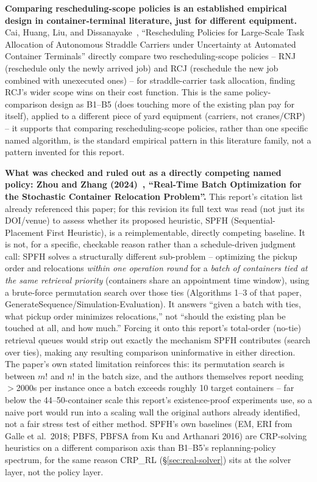 \documentclass[11pt]{article}
\begin{document}
\textbf{Comparing rescheduling-scope policies is an established empirical
design in container-terminal literature, just for different equipment.}
Cai, Huang, Liu, and Dissanayake~\cite{cai2014}, ``Rescheduling Policies for Large-Scale
Task Allocation of Autonomous Straddle Carriers under Uncertainty at
Automated Container Terminals'' directly compare two rescheduling-scope policies --
RNJ (reschedule only the newly arrived job) and RCJ (reschedule the new
job combined with unexecuted ones) -- for straddle-carrier task
allocation, finding RCJ's wider scope wins on their cost function. This
is the same policy-comparison design as B1--B5 (does touching more of the
existing plan pay for itself), applied to a different piece of yard
equipment (carriers, not cranes/CRP) -- it supports that comparing
rescheduling-scope policies, rather than one specific named algorithm, is
the standard empirical pattern in this literature family, not a pattern
invented for this report.

\textbf{What was checked and ruled out as a directly competing named
policy: Zhou and Zhang (2024)~\cite{zhou2024}, ``Real-Time Batch Optimization for the
Stochastic Container Relocation Problem''.} This report's citation
list already referenced this paper; for this revision its full text was
read (not just its DOI/venue) to assess whether its proposed heuristic,
SPFH (Sequential-Placement First Heuristic), is a reimplementable,
directly competing baseline. It is not, for a specific, checkable reason
rather than a schedule-driven judgment call: SPFH solves a structurally
different sub-problem -- optimizing the pickup order and relocations
\emph{within one operation round} for a \emph{batch of containers tied at
the same retrieval priority} (containers share an appointment time
window), using a brute-force permutation search over those ties
(Algorithms 1--3 of that paper, GenerateSequence/Simulation-Evaluation).
It answers ``given a batch with ties, what pickup order minimizes
relocations,'' not ``should the existing plan be touched at all, and how
much.'' Forcing it onto this report's total-order (no-tie) retrieval
queues would strip out exactly the mechanism SPFH contributes (search
over ties), making any resulting comparison uninformative in either
direction. The paper's own stated limitation reinforces this: its
permutation search is between $m!$ and $n!$ in the batch size, and the
authors themselves report needing $>$2000s per instance once a batch
exceeds roughly 10 target containers -- far below the 44--50-container
scale this report's existence-proof experiments use, so a naive port
would run into a scaling wall the original authors already identified,
not a fair stress test of either method. SPFH's own baselines (EM, ERI
from Galle et al.\ 2018; PBFS, PBFSA from Ku and Arthanari 2016) are
CRP-solving heuristics on a different comparison axis than B1--B5's
replanning-policy spectrum, for the same reason CRP\_RL
(\S\ref{sec:real-solver}) sits at the solver layer, not the policy layer.
\end{document}
